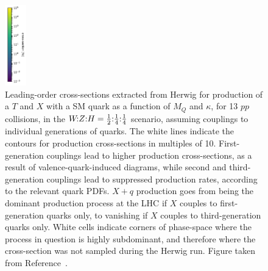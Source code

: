 \begin{figure}[tbp]
    \includegraphics[height=3.5cm]{Figures/VLQ/xsScans/3rdGen/cbar.pdf} %
    \caption{Leading-order cross-sections extracted from Herwig for production of a $T$ and $X$
      with a SM quark as a function of $M_Q$ and $\kappa$, for \unit{13}{\TeV} $pp$
      collisions, in the $\text{$W\!$:$Z$:$H$} = \text{$\tfrac{1}{2}$:$\tfrac{1}{4}$:$\tfrac{1}{4}$}$ scenario, assuming couplings to individual
      generations of quarks.  The white lines indicate the contours for production
      cross-sections in multiples of 10. First-generation couplings lead to higher
      production cross-sections, as a result of valence-quark-induced diagrams,
      while second and third-generation couplings lead to suppressed production
      rates, according to the relevant quark PDFs. $X+q$ production goes from being
      the dominant production process at the LHC if $X$ couples to first-generation
      quarks only, to vanishing if $X$ couples to third-generation quarks only.
      White cells indicate corners of phase-space where the process in question is highly subdominant, and therefore where the cross-section was not sampled during the Herwig run. Figure taken from Reference~\cite{VLQ_contur}.}
    \label{fig:Qqproduction}
\end{figure}

